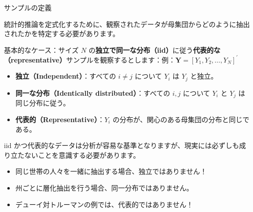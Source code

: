 \documentclass[11pt,handout]{beamer}
\newenvironment{wideitemize}{\itemize\addtolength{\itemsep}{10pt}}{\enditemize}
\begin{document}
\begin{frame}{サンプルの定義}
	\begin{wideitemize}	
	
	\item
	統計的推論を定式化するために、観察されたデータが母集団からどのように抽出されたかを特定する必要があります。
	
	\pause{}
	
	\item 基本的なケース：サイズ $N$ の\textbf{独立で同一な分布（iid）}に従う\textbf{代表的な（representative）}サンプルを観察するとします：例：$\mathbf{Y}=[Y_{1},Y_{2},\dots,Y_{N}]^\prime$
	
	\pause{}\smallskip
\begin{itemize}
	\item \textbf{独立（Independent）}：すべての $i\neq j$ について $Y_i$ は $Y_j$ と独立。
	
\smallskip
	\pause{}
	\item \textbf{同一な分布（Identically distributed）}：すべての $i, j$ について $Y_i$ と $Y_j$ は同じ分布に従う。

\pause{}
\smallskip
	\item
	\textbf{代表的（Representative）}：$Y_i$ の分布が、関心のある母集団の分布と同じである。
	
\end{itemize}		
	\pause	
	\item	
	iid かつ代表的なデータは分析が容易な基準となりますが、現実には必ずしも成り立たないことを意識する必要があります。
		\begin{itemize}
			\pause
\smallskip
			\item
			同じ世帯の人々を一緒に抽出する場合、独立ではありません！
		
\smallskip	
			\pause
			\item
			州ごとに層化抽出を行う場合、同一分布ではありません。
			\pause

\smallskip
			\item 
			デューイ対トルーマンの例では、代表的ではありません！
		\end{itemize}
	\end{wideitemize}

\end{frame}
\end{document}
